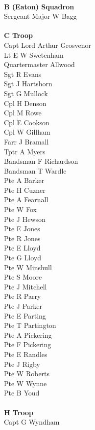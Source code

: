 \begin{multicols}{2}
  \\
  \textbf{B (Eaton) Squadron} \\
  Sergeant Major W Bagg \\
  \\
  \textbf{C Troop} \\
  Capt Lord Arthur Grosvenor \\
  Lt E W Swetenham \\
  Quartermaster Allwood \\
  Sgt R Evans \\
  Sgt J Hartshorn \\
  Sgt G Mullock \\
  Cpl H Denson \\
  Cpl M Rowe \\
  Cpl E Cookson \\
  Cpl W Gillham \\
  Farr J Bramall \\
  Tptr A Myers \\
  Bandsman F Richardson \\
  Bandsman T Wardle \\
  Pte A Barker \\
  Pte H Cuzner \\
  Pte A Fearnall \\
  Pte W Fox \\
  Pte J Hewson \\
  Pte E Jones \\
  Pte R Jones \\
  Pte E Lloyd \\
  Pte G Lloyd \\
  Pte W Minshull \\
  Pte S Moore \\
  Pte J Mitchell \\
  Pte R Parry \\
  Pte J Parker \\
  Pte E Parting \\
  Pte T Partington \\
  Pte A Pickering \\
  Pte F Pickering \\
  Pte E Randles \\
  Pte J Rigby \\
  Pte W Roberts \\
  Pte W Wynne \\
  Pte B Youd \\
  \\
  \textbf{H Troop} \\
  Capt G Wyndham \\

\end{multicols}
